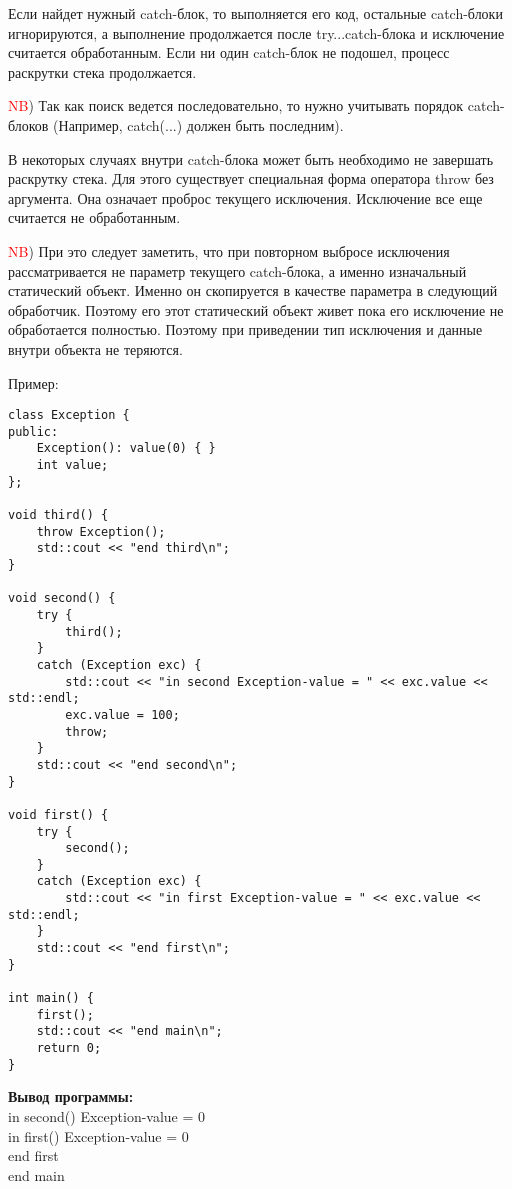 Если найдет нужный catch-блок, то выполняется его код, остальные catch-блоки игнорируются, а выполнение продолжается после try...catch-блока и исключение считается обработанным. Если ни один catch-блок не подошел, процесс раскрутки стека продолжается.

\textcolor{red}{NB}) Так как поиск ведется последовательно, то нужно учитывать порядок catch-блоков (Например, catch(...) должен быть последним).

В некоторых случаях внутри catch-блока может быть необходимо не завершать раскрутку стека. Для этого существует специальная форма оператора throw без аргумента. Она означает проброс текущего исключения. Исключение все еще считается не обработанным.

\textcolor{red}{NB}) При это следует заметить, что при повторном выбросе исключения рассматривается не параметр текущего catch-блока, а именно изначальный статический объект. Именно он скопируется в качестве параметра в следующий обработчик. Поэтому его этот статический объект живет пока его исключение не обработается полностью. Поэтому при приведении тип исключения и данные внутри объекта не теряются.


Пример:
\begin{verbatim}
class Exception {
public:
    Exception(): value(0) { }
    int value;
};

void third() {
    throw Exception();
    std::cout << "end third\n";
}

void second() {
    try {
        third();
    }
    catch (Exception exc) {
        std::cout << "in second Exception-value = " << exc.value << std::endl;
        exc.value = 100;
        throw;
    }
    std::cout << "end second\n";
}

void first() {
    try {
        second();
    }
    catch (Exception exc) {
        std::cout << "in first Exception-value = " << exc.value << std::endl;
    }
    std::cout << "end first\n";
}

int main() {
    first();
    std::cout << "end main\n";
    return 0;
}
\end{verbatim}

\textbf{Вывод программы:} \\
in second() Exception-value = 0 \\
in first() Exception-value = 0 \\
end first \\
end main \\

